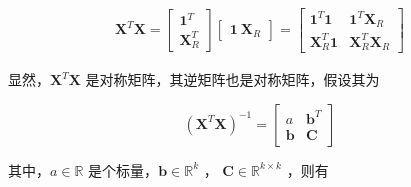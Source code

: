 \documentclass[UTF8]{ctexart}
\begin{document}
    \begin{equation}
        \begin{aligned}
            \boldsymbol{X}^T \boldsymbol{X} 
            = \begin{bmatrix}
                \boldsymbol{1}^T \\
                \boldsymbol{X}_R^T
            \end{bmatrix} \begin{bmatrix}
                \boldsymbol{1} \  \boldsymbol{X}_R
            \end{bmatrix} = \begin{bmatrix}
                \boldsymbol{1}^T \boldsymbol{1} & \boldsymbol{1}^T \boldsymbol{X}_R \\
                \boldsymbol{X}_R^T \boldsymbol{1} & \boldsymbol{X}_R^T \boldsymbol{X}_R
            \end{bmatrix}
        \end{aligned}
    \end{equation}

    显然，$ \boldsymbol{X}^T \boldsymbol{X} $ 是对称矩阵，其逆矩阵也是对称矩阵，假设其为
    
    \begin{equation}
    	(\boldsymbol{X}^T \boldsymbol{X})^{-1} = \begin{bmatrix}
    		a & \boldsymbol{b}^T \\
    		\boldsymbol{b} & \boldsymbol{C}
    	\end{bmatrix}
    \end{equation}

    其中，$ a \in \mathbb{R} $ 是个标量，$ \boldsymbol{b} \in \mathbb{R}^k $ ， $ \boldsymbol{C} \in \mathbb{R}^{k \times k} $ ，则有
    
\end{document}
